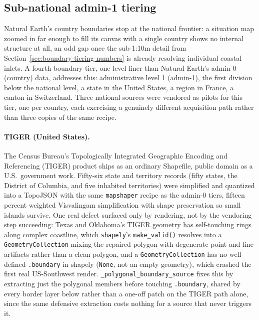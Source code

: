\documentclass[11pt]{article}
\begin{document}
\subsection{Sub-national admin-1 tiering}
\label{sec:admin1-tiering}

Natural Earth's country boundaries stop at the national frontier: a
situation map zoomed in far enough to fill its canvas with a single
country shows no internal structure at all, an odd gap once the
sub-1:10m detail from Section~\ref{sec:boundary-tiering-numbers} is
already resolving individual coastal inlets. A fourth boundary tier,
one level finer than Natural Earth's admin-0 (country) data, addresses
this: administrative level 1 (admin-1), the first division below the
national level, a state in the United States, a region in France, a
canton in Switzerland. Three national sources were vendored as pilots
for this tier, one per country, each exercising a genuinely different
acquisition path rather than three copies of the same recipe.

\paragraph{TIGER (United States).} The Census Bureau's
Topologically Integrated Geographic Encoding and Referencing (TIGER)
product \autocite{census-tiger} ships as an ordinary Shapefile, public
domain as a U.S.\ government work. Fifty-six state and territory
records (fifty states, the District of Columbia, and five inhabited
territories) were simplified and quantized into a TopoJSON with the
same \texttt{mapshaper} recipe as the admin-0 tiers, fifteen percent
weighted Visvalingam simplification with shape preservation so small
islands survive. One real defect surfaced only by rendering, not by
the vendoring step succeeding: Texas and Oklahoma's TIGER geometry
has self-touching rings along complex coastline, which
\texttt{shapely}'s \texttt{make\_valid()} resolves into a
\texttt{GeometryCollection} mixing the repaired polygon with
degenerate point and line artifacts rather than a clean polygon, and a
\texttt{GeometryCollection} has no well-defined \texttt{.boundary} in
shapely (\texttt{None}, not an empty geometry), which crashed the
first real US-Southwest render. \texttt{\_polygonal\_boundary\_source}
fixes this by extracting just the polygonal members before touching
\texttt{.boundary}, shared by every border layer below rather than a
one-off patch on the TIGER path alone, since the same defensive
extraction costs nothing for a source that never triggers it.
\end{document}
